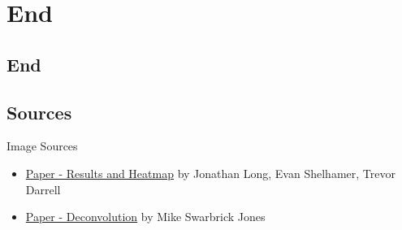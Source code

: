 \section*{End}
\subsection{End}
\subsection{Sources}
\begin{frame}{Image Sources}
    \begin{itemize}
        \item \href{http://arxiv.org/abs/1411.4038}{Paper - Results and Heatmap} by Jonathan Long, Evan Shelhamer, Trevor Darrell
    \end{itemize}
        \begin{itemize}
        \item \href{https://swarbrickjones.wordpress.com/2015/04/29/convolutional-autoencoders-in-pythontheanolasagne/}{Paper - Deconvolution} by Mike Swarbrick Jones
    \end{itemize}
\end{frame}

